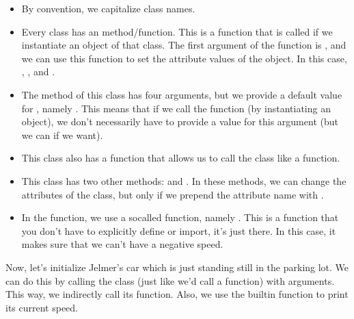 \documentclass[letterpaper,10pt,english]{jupyterBook}
\begin{document}
\begin{itemize}
\item {} 
\sphinxAtStartPar
By convention, we capitalize class names.

\item {} 
\sphinxAtStartPar
Every class has an  method/function. This is a function that is called if we instantiate an object of that class. The first argument of the  function is , and we can use this function to set the attribute values of the object. In this case, , , and .

\item {} 
\sphinxAtStartPar
The  method of this class has four arguments, but we provide a default value for , namely . This means that if we call the  function (by instantiating an object), we don’t necessarily have to provide a value for this argument (but we can if we want).

\item {} 
\sphinxAtStartPar
This class also has a  function that allows us to call the class like a function.

\item {} 
\sphinxAtStartPar
This class has two other methods:  and . In these methods, we can change the attributes of the class, but only if we prepend the attribute name with .

\item {} 
\sphinxAtStartPar
In the  function, we use a so\sphinxhyphen{}called  function, namely . This is a function that you don’t have to explicitly define or import, it’s just there. In this case, it makes sure that we can’t have a negative speed.

\end{itemize}

\sphinxAtStartPar
Now, let’s initialize Jelmer’s car which is just standing still in the parking lot. We can do this by calling the class (just like we’d call a function) with arguments. This way, we indirectly call its  function. Also, we use the built\sphinxhyphen{}in  function to print its current speed.
\end{document}

